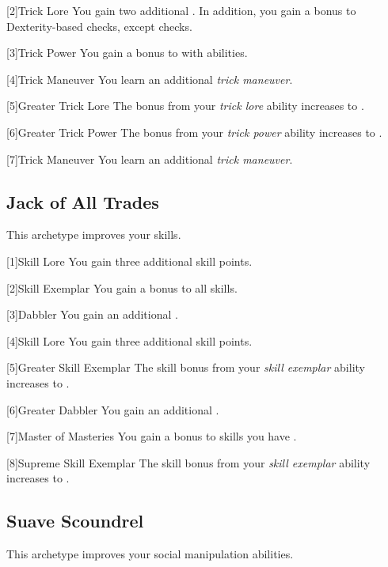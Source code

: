         [2]{Trick Lore} You gain two additional .
        In addition, you gain a  bonus to Dexterity-based checks, except  checks.

        [3]{Trick Power} You gain a  bonus to  with  abilities.

        [4]{Trick Maneuver}
        You learn an additional \textit{trick maneuver}.

        [5]{Greater Trick Lore} The bonus from your \textit{trick lore} ability increases to .

        [6]{Greater Trick Power} The bonus from your \textit{trick power} ability increases to .

        [7]{Trick Maneuver}
        You learn an additional \textit{trick maneuver}.

    \subsection{Jack of All Trades}
        This archetype improves your skills.

        [1]{Skill Lore} You gain three additional skill points.

        [2]{Skill Exemplar} You gain a  bonus to all skills.

        [3]{Dabbler} You gain an additional .

        [4]{Skill Lore} You gain three additional skill points.

        [5]{Greater Skill Exemplar} The skill bonus from your \textit{skill exemplar} ability increases to .

        [6]{Greater Dabbler} You gain an additional .

        [7]{Master of Masteries} You gain a  bonus to skills you have .

        [8]{Supreme Skill Exemplar} The skill bonus from your \textit{skill exemplar} ability increases to .

    \subsection{Suave Scoundrel}
        This archetype improves your social manipulation abilities.

